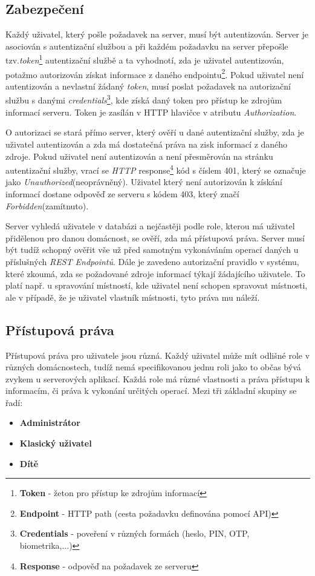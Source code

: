 \subsection*{Zabezpečení}
\label{backend:bezpecnost}
Každý uživatel, který pošle požadavek na server, musí být autentizován.
Server je asociován s autentizační službou a při každém požadavku na server přepošle tzv.\emph{token}\footnote{\textbf{Token} - žeton pro přístup ke zdrojům informací} autentizační službě
a ta vyhodnotí, zda je uživatel autentizován, potažmo autorizován získat informace z daného endpointu\footnote{\textbf{Endpoint} - HTTP path (cesta požadavku definována pomocí API)}.
Pokud uživatel není autentizován a nevlastní žádaný \emph{token}, musí poslat požadavek na autorizační službu s danými \emph{credentials}\footnote{\textbf{Credentials} - poveření v různých formách (heslo, PIN, OTP, biometrika,...)},
kde získá daný token pro přístup ke zdrojům informací serveru. Token je zasílán v HTTP hlavičce v atributu \emph{Authorization}.

O autorizaci se stará přímo server, který ověří u dané autentizační služby, zda je uživatel autentizován a zda má dostatečná práva na zisk informací z daného zdroje.
Pokud uživatel není autentizován a není přesměrován na stránku autentizační služby, vrací se \emph{HTTP} response\footnote{\textbf{Response} - odpověď na požadavek ze serveru} kód s číslem 401, který se označuje jako \emph{Unauthorized}(neoprávněný).
Uživatel který není autorizován k získání informací dostane odpověď ze serveru s kódem 403, který značí \emph{Forbidden}(zamítnuto).

Server vyhledá uživatele v databázi a nejčastěji podle role, kterou má uživatel přidělenou pro danou domácnost, se ověří, zda má přístupová práva.
Server musí být tudíž schopný ověřit vše už před samotným vykonáváním operací daných u příslušných \emph{REST Endpointů}.
Dále je zavedeno autorizační pravidlo v systému, které zkoumá, zda se požadované zdroje informací týkají žádajícího uživatele.
To platí např. u spravování místností, kde uživatel není schopen spravovat místnosti, ale v případě, že je uživatel vlastník místnosti, tyto práva mu náleží.

\subsection*{Přístupová práva}
\label{backend:prava}
Přístupová práva pro uživatele jsou různá. Každý uživatel může mít odlišné role v různých domácnostech, tudíž nemá specifikovanou jednu roli jako to občas bývá zvykem u serverových aplikací.
Každá role má různé vlastnosti a práva přístupu k informacím, či práva k vykonání určitých operací.
\newline
Mezi tři základní skupiny se řadí:
\begin{itemize}
  \item \textbf{Administrátor}
  \item \textbf{Klasický uživatel}
  \item \textbf{Dítě}
\end{itemize}

